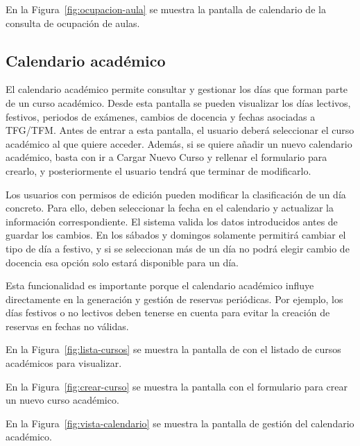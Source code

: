 En la Figura~\ref{fig:ocupacion-aula} se muestra la pantalla de calendario de la consulta de ocupación de aulas.


\subsection{Calendario académico}

El calendario académico permite consultar y gestionar los días que forman parte de un curso académico. Desde esta pantalla se pueden visualizar los días lectivos, festivos, periodos de exámenes, cambios de docencia y fechas asociadas a TFG/TFM. Antes de entrar a esta pantalla, el usuario deberá seleccionar el curso académico al que quiere acceder. Además, si se quiere añadir un nuevo calendario académico, basta con ir a Cargar Nuevo Curso y rellenar el formulario para crearlo, y posteriormente el usuario tendrá que terminar de modificarlo.

Los usuarios con permisos de edición pueden modificar la clasificación de un día concreto. Para ello, deben seleccionar la fecha en el calendario y actualizar la información correspondiente. El sistema valida los datos introducidos antes de guardar los cambios. En los sábados y domingos solamente permitirá cambiar el tipo de día a festivo, y si se seleccionan más de un día no podrá elegir cambio de docencia esa opción solo estará disponible para un día.

Esta funcionalidad es importante porque el calendario académico influye directamente en la generación y gestión de reservas periódicas. Por ejemplo, los días festivos o no lectivos deben tenerse en cuenta para evitar la creación de reservas en fechas no válidas.

En la Figura~\ref{fig:lista-cursos} se muestra la pantalla de con el listado de cursos académicos para visualizar.


En la Figura~\ref{fig:crear-curso} se muestra la pantalla con el formulario para crear un nuevo curso académico.


En la Figura~\ref{fig:vista-calendario} se muestra la pantalla de gestión del calendario académico.

